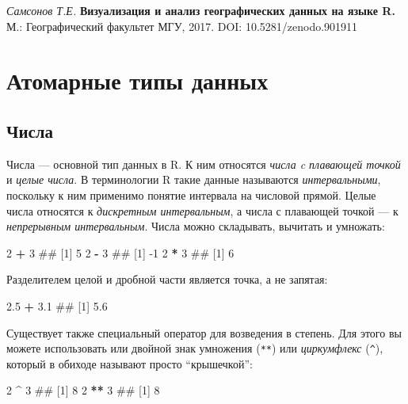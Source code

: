 \documentclass[]{book}
\newenvironment{Shaded}{\begin{snugshade}}{\end{snugshade}}
\newcommand{\DecValTok}[1]{\textcolor[rgb]{0.00,0.00,0.81}{#1}}
\newcommand{\FloatTok}[1]{\textcolor[rgb]{0.00,0.00,0.81}{#1}}
\newcommand{\StringTok}[1]{\textcolor[rgb]{0.31,0.60,0.02}{#1}}
\newcommand{\OperatorTok}[1]{\textcolor[rgb]{0.81,0.36,0.00}{\textbf{#1}}}
\newcommand{\NormalTok}[1]{#1}
\begin{document}
\emph{Самсонов Т.Е.} \textbf{Визуализация и анализ географических данных
на языке R.} М.: Географический факультет МГУ, 2017. DOI:
10.5281/zenodo.901911

\chapter{Атомарные типы данных}\label{data_types}

\section{Числа}\label{numbers}

Числа --- основной тип данных в R. К ним относятся \emph{числа c
плавающей точкой} и \emph{целые числа}. В терминологии R такие данные
называются \emph{интервальными}, поскольку к ним применимо понятие
интервала на числовой прямой. Целые числа относятся к \emph{дискретным
интервальным}, а числа с плавающей точкой --- к \emph{непрерывным
интервальным}. Числа можно складывать, вычитать и умножать:

\begin{Shaded}
\begin{Highlighting}[]
\DecValTok{2} \OperatorTok{+}\StringTok{ }\DecValTok{3}
\NormalTok{## [1] 5}
\DecValTok{2} \OperatorTok{-}\StringTok{ }\DecValTok{3}
\NormalTok{## [1] -1}
\DecValTok{2} \OperatorTok{*}\StringTok{ }\DecValTok{3}
\NormalTok{## [1] 6}
\end{Highlighting}
\end{Shaded}

Разделителем целой и дробной части является точка, а не запятая:

\begin{Shaded}
\begin{Highlighting}[]
\FloatTok{2.5} \OperatorTok{+}\StringTok{ }\FloatTok{3.1}
\NormalTok{## [1] 5.6}
\end{Highlighting}
\end{Shaded}

Существует также специальный оператор для возведения в степень. Для
этого вы можете использовать или двойной знак умножения (\texttt{**})
или \emph{циркумфлекс} (\texttt{\^{}}), который в обиходе называют
просто ``крышечкой'':

\begin{Shaded}
\begin{Highlighting}[]
\DecValTok{2} \OperatorTok{^}\StringTok{ }\DecValTok{3}
\NormalTok{## [1] 8}
\DecValTok{2} \OperatorTok{**}\StringTok{ }\DecValTok{3}
\NormalTok{## [1] 8}
\end{Highlighting}
\end{Shaded}
\end{document}

